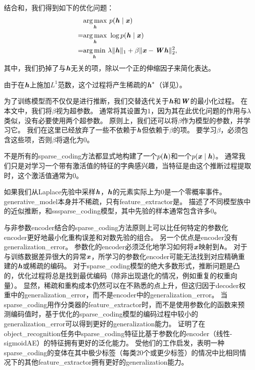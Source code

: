 结合和，我们得到如下的优化问题：
\begin{align}
\label{eqn:1316}
& \underset{\boldsymbol{\mathit{h}}}{\arg\max}\  p(\boldsymbol{\mathit{h}}\mid\boldsymbol{\mathit{x}}) \\
= & \underset{\boldsymbol{\mathit{h}}}{\arg\max}\ \log  p(\boldsymbol{\mathit{h}}\mid\boldsymbol{\mathit{x}})\\
= & \underset{\boldsymbol{\mathit{h}}}{\arg\min}\ \lambda \Vert \boldsymbol{\mathit{h}}\Vert_1 + \beta  \Vert \boldsymbol{\mathit{x}} - \boldsymbol{\mathit{W}} \boldsymbol{\mathit{h}}\Vert_2^2,
\end{align}
其中，我们扔掉了与$\boldsymbol{\mathit{h}}$无关的项，除以一个正的伸缩因子来简化表达。

由于在$\boldsymbol{\mathit{h}}$上施加$L^1$范数，这个过程将产生稀疏的$\boldsymbol{\mathit{h}}^*$（详见）。


为了训练模型而不仅仅是进行推断，我们交替迭代关于$\boldsymbol{\mathit{h}}$和$\boldsymbol{\mathit{W}}$的最小化过程。
在本文中，我们将$\beta$视为超参数。
通常将其设置为$1$，因为其在此优化问题的作用与$\lambda$类似，没有必要使用两个超参数。 
原则上，我们还可以将$\beta$作为模型的参数，并学习它。
我们在这里已经放弃了一些不依赖于$\boldsymbol{\mathit{h}}$但依赖于$\beta$的项。
要学习$\beta$，必须包含这些项，否则$\beta$将退化为$0$。


不是所有的\gls{sparse_coding}方法都显式地构建了一个$p(\boldsymbol{\mathit{h}})$和一个$p(\boldsymbol{\mathit{x}}\mid\boldsymbol{\mathit{h}})$。 
通常我们只是对学习一个带有激活值的特征的字典感兴趣，当特征是由这个推断过程提取时，这个激活值通常为$0$。

如果我们从Laplace先验中采样$\boldsymbol{\mathit{h}}$，$\boldsymbol{\mathit{h}}$的元素实际上为$0$是一个零概率事件。
\gls{generative_model}本身并不稀疏，只有\gls{feature_extractor}是。
\citet{Goodfeli-et-al-TPAMI-Deep-PrePrint-2013-small}描述了不同模型族中的近似推断，和\gls{ss}\gls{sparse_coding}模型，其中先验的样本通常包含许多$0$。

与非参数\gls{encoder}结合的\gls{sparse_coding}方法原则上可以比任何特定的参数化\gls{encoder}更好地最小化重构误差和对数先验的组合。
另一个优点是\gls{encoder}没有\gls{generalization_error}。
参数化的\gls{encoder}必须泛化地学习如何将$\boldsymbol{\mathit{x}}$映射到$\boldsymbol{\mathit{h}}$。
对于与训练数据差异很大的异常$\boldsymbol{\mathit{x}}$，所学习的参数化\gls{encoder}可能无法找到对应精确重建的$\boldsymbol{\mathit{h}}$或稀疏的编码。
对于\gls{sparse_coding}模型的绝大多数形式，推断问题是凸的，优化过程将总是找到最优编码（除非出现退化的情况，例如重复的权重向量）。
显然，稀疏和重构成本仍然可以在不熟悉的点上升，但这归因于\gls{decoder}权重中的\gls{generalization_error}，而不是\gls{encoder}中的\gls{generalization_error}。
当\gls{sparse_coding}用作分类器的\gls{feature_extractor}时，而不是使用参数化的函数来预测编码值时，基于优化的\gls{sparse_coding}模型的编码过程中较小的\gls{generalization_error}可以得到更好的\gls{generalization}能力。
\citet{Coates2011b}证明了在\gls{object_recognition}任务中\gls{sparse_coding}特征比基于参数化的\gls{encoder}（线性-\gls{sigmoid}\gls{AE}）的特征拥有更好的泛化能力。
受他们的工作启发，\citet{Goodfeli-et-al-TPAMI-Deep-PrePrint-2013-small}表明一种\gls{sparse_coding}的变体在其中极少标签（每类20个或更少标签）的情况中比相同情况下的其他\gls{feature_extractor}拥有更好的\gls{generalization}能力。



